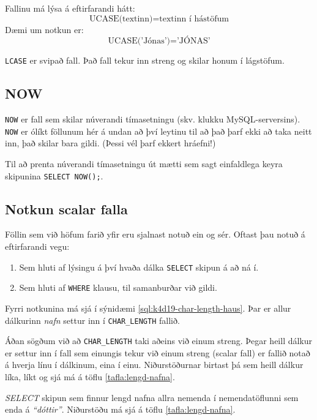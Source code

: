 Fallinu má lýsa á eftirfarandi hátt:
\[
\text{UCASE(textinn)} = \text{textinn í hástöfum}
\]
Dæmi um notkun er:
\[
\text{UCASE('Jónas')} = \text{'JÓNAS'}
\]

\verb|LCASE| er svipað fall. Það fall tekur inn streng og skilar honum í lágstöfum. 
\subsection{NOW}
\verb|NOW| er fall sem skilar núverandi tímasetningu (skv. klukku MySQL-serversins). \verb|NOW| er ólíkt föllunum hér á undan að því leytinu til að það þarf ekki að taka neitt inn, það skilar bara gildi. (Þessi vél þarf ekkert hráefni!)

Til að prenta núverandi tímasetningu út mætti sem sagt einfaldlega keyra skipunina \verb|SELECT NOW();|.
\subsection{Notkun scalar falla}
Föllin sem við höfum farið yfir eru sjalnast notuð ein og sér. Oftast þau notuð á eftirfarandi vegu:
\begin{enumerate}
 \item Sem hluti af lýsingu á því hvaða dálka \verb|SELECT| skipun á að ná í.
 \item Sem hluti af \verb|WHERE| klausu, til samanburðar við gildi.
\end{enumerate}

Fyrri notkunina má sjá í sýnidæmi \ref{sql:k4d19-char-length-haus}. Þar er allur dálkurinn \emph{nafn} settur inn í \verb|CHAR_LENGTH| fallið.

Áðan sögðum við að \verb|CHAR_LENGTH| taki aðeins við einum streng. Þegar heill dálkur er settur inn í fall sem einungis tekur við einum streng (scalar fall) er fallið notað á hverja línu í dálkinum, eina í einu. Niðurstöðurnar birtast þá sem heill dálkur líka, líkt og sjá má á töflu \ref{tafla:lengd-nafna}.

\begin{example}
\caption[CHAR\_LENGTH í dálklýsingu]{\emph{SELECT} skipun sem finnur lengd nafna allra nemenda í nemendatöflunni sem enda á \emph{``dóttir''}. Niðurstöðu má sjá á töflu \ref{tafla:lengd-nafna}.}
\label{sql:k4d19-char-length-haus}
\centering
{}
\end{example}

